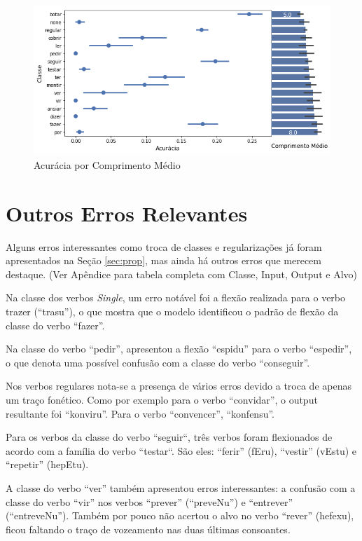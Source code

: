 \begin{figure}[H]
  \centering
  \includegraphics[width=0.8\linewidth]{img/comp_acc.png}
  \caption{Acurácia por Comprimento Médio}
  \label{fig:kfoldprop}
\end{figure}


\section{Outros Erros Relevantes}
\label{sec:interesting}

Alguns erros interessantes como troca de classes e regularizações já foram apresentados na Seção \ref{sec:prop}, mas ainda há outros erros que merecem destaque. (Ver Apêndice para tabela completa com Classe, Input, Output e Alvo)

Na classe dos verbos \textit{Single}, um erro notável foi a flexão realizada para o verbo trazer (“trasu”), o que mostra que o modelo identificou o padrão de flexão da classe do verbo “fazer”. 

Na classe do verbo “pedir”, apresentou a flexão “espidu” para o verbo “espedir”, o que denota uma possível confusão com a classe do verbo “conseguir”.

Nos verbos regulares nota-se a presença de vários erros devido a troca de apenas um traço fonético. Como por exemplo para o verbo “convidar”, o output resultante foi “konviru”. Para o verbo “convencer”, “konfensu”.

Para os verbos da classe do verbo “seguir“, três verbos foram flexionados de acordo com a família do verbo “testar“. São eles: “ferir” (fEru), “vestir” (vEstu) e “repetir” (hepEtu).

A classe do verbo “ver” também apresentou erros interessantes: a confusão com a classe do verbo “vir” nos verbos “prever” (“preveNu”) e “entrever” (“entreveNu”). Também por pouco não acertou o alvo no verbo “rever” (hefexu), ficou faltando o traço de vozeamento nas duas últimas consoantes.

